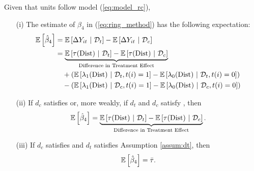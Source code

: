 \documentclass[10pt]{article}
\newcommand{\dist}{\text{Dist}}
\begin{document}
\begin{proposition}\label{prop:ring_decomp_rc}  
    Given that units follow model (\ref{eq:model_rc}),
    \begin{enumerate}
        \item[(i)] The estimate of $\beta_4$ in (\ref{eq:ring_method}) has the following expectation:
        \begin{align*}
            \expec{\hat{\beta}_4} &= \condexpec{\Delta Y_{it}}{\mathcal{D}_t} - \condexpec{\Delta Y_{it}}{\mathcal{D}_c} \\
            &=  \underbrace{\condexpec{\tau(\dist)}{\mathcal{D}_t} - \condexpec{\tau(\dist)}{\mathcal{D}_c} }_{\text{Difference in Treatment Effect}} \\
            &\quad + ( \condexpec{\lambda_1(\dist)}{\mathcal{D}_t, t(i) = 1} - \condexpec{\lambda_0(\dist)}{\mathcal{D}_t, t(i) = 0} ) \\
            &\quad - ( \condexpec{\lambda_1(\dist)}{\mathcal{D}_c, t(i) = 1} - \condexpec{\lambda_0(\dist)}{\mathcal{D}_c, t(i) = 0} )   \\
        \end{align*}
        
        \item[(ii)] If $d_c$ satisfies  or, more weakly, if $d_t$ and $d_c$ satisfy , then
        \[ 
            \expec{\hat{\beta}_4} = 
            \underbrace{\condexpec{\tau(\dist)}{\mathcal{D}_t} - \condexpec{\tau(\dist)}{\mathcal{D}_c} }_{\text{Difference in Treatment Effect}}.
        \] 
    
        \item[(iii)] If $d_c$ satisfies  and $d_t$ satisfies Assumption \ref{assum:dt}, then
        \[ 
            \mathbb{E}\left[\hat{\beta}_4\right] = \bar{\tau}.
        \]
    \end{enumerate}
\end{proposition}
\end{document}
